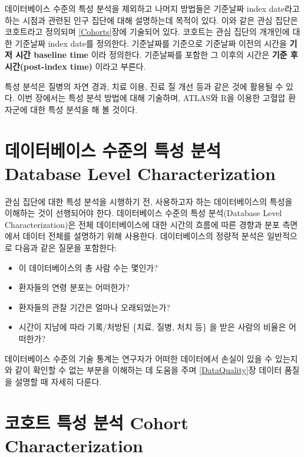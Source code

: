 \documentclass[11pt]{book}
\providecommand{\tightlist}{%
  \setlength{\itemsep}{0pt}\setlength{\parskip}{0pt}}
\theoremstyle{definition}
\theoremstyle{definition}
\theoremstyle{definition}
\theoremstyle{remark}
\begin{document}
데이터베이스 수준의 특성 분석을 제외하고 나머지 방법들은 기준날짜 index
date라고 하는 시점과 관련된 인구 집단에 대해 설명하는데 목적이 있다.
이와 같은 관심 집단은 코호트라고 정의되며 \ref{Cohorts}장에 기술되어
있다. 코호트는 관심 집단의 개개인에 대한 기준날짜 index date를 정의한다.
기준날짜를 기준으로 기준날짜 이전의 시간을 \textbf{기저 시간 baseline
time} 이라 정의한다. 기준날짜를 포함한 그 이후의 시간은 \textbf{기준 후
시간(post-index time)} 이라고 부른다.

특성 분석은 질병의 자연 경과, 치료 이용, 진료 질 개선 등과 같은 것에
활용될 수 있다. 이번 장에서는 특성 분석 방법에 대해 기술하며, ATLAS와
R을 이용한 고혈압 환자군에 대한 특성 분석을 해 볼
것이다.
  

\section{데이터베이스 수준의 특성 분석 Database Level
Characterization}\label{----database-level-characterization}

관심 집단에 대한 특성 분석을 시행하기 전, 사용하고자 하는 데이터베이스의
특성을 이해하는 것이 선행되어야 한다. 데이터베이스 수준의 특성
분석(Database Level Characterization)은 전체 데이터베이스에 대한 시간의
흐름에 따른 경향과 분포 측면에서 데이터 전체를 설명하기 위해 사용한다.
데이터베이스의 정량적 분석은 일반적으로 다음과 같은 질문을 포함한다:

\begin{itemize}
\tightlist
\item
  이 데이터베이스의 총 사람 수는 몇인가?
\item
  환자들의 연령 분포는 어떠한가?
\item
  환자들의 관찰 기간은 얼마나 오래되었는가?
\item
  시간이 지남에 따라 기록/처방된 \{치료, 질병, 처치 등\} 을 받은 사람의
  비율은 어떠한가?
\end{itemize}

데이터베이스 수준의 기술 통계는 연구자가 어떠한 데이터에서 손실이 있을
수 있는지와 같이 확인할 수 없는 부분을 이해하는 데 도움을 주며
\ref{DataQuality}장 데이터 품질을 설명할 때 자세히 다룬다.

\section{코호트 특성 분석 Cohort
Characterization}\label{---cohort-characterization}
\end{document}
